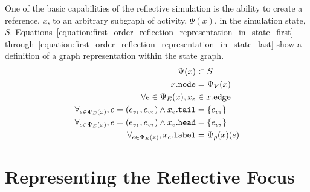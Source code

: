 One of the basic capabilities of the reflective simulation is the
ability to create a reference, $x$, to an arbitrary subgraph of
activity, $\Psi(x)$, in the simulation state, $S$.
{\mbox{Equations~\ref{equation:first_order_reflection_representation_in_state_first}}}
{\mbox{through~\ref{equation:first_order_reflection_representation_in_state_last}}}
show a definition of a graph representation within the state graph.
\begin{align}
\label{equation:first_order_reflection_representation_in_state_first}
                                                                    \Psi(x) &\subset S \\
                                                         x.\text{\tt{node}} &= \Psi_V(x) \\
                                               \forall e \in \Psi_E(x), x_e &\in x.\text{\tt{edge}} \\
   \forall_{e \in \Psi_E(x)}, e = (e_{v_1}, e_{v_2}) \wedge x_e.\text{\tt{tail}} &= \{e_{v_1}\} \\
   \forall_{e \in \Psi_E(x)}, e = (e_{v_1}, e_{v_2}) \wedge x_e.\text{\tt{head}} &= \{e_{v_2}\} \\
\label{equation:first_order_reflection_representation_in_state_last}
                              \forall_{e \in \Psi_E(x)}, x_e.\text{\tt{label}} &= \Psi_\rho(x)(e)
\end{align}

\section{Representing the Reflective Focus}

